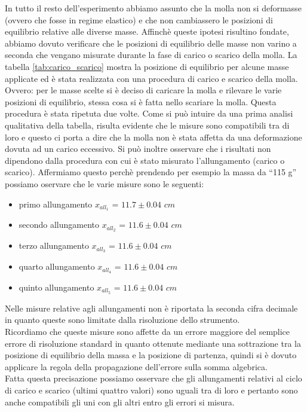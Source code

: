 In tutto il resto dell'esperimento abbiamo assunto che la molla non si deformasse (ovvero che fosse in regime elastico)
e che non cambiassero le posizioni di equilibrio relative alle diverse masse. Affinchè queste ipotesi risultino fondate,
abbiamo dovuto verificare che le posizioni di equilibrio delle masse non varino a seconda che vengano misurate durante la fase di carico o scarico della molla. La tabella \ref{tab:carico_scarico} mostra la posizione di equilibrio per alcune masse applicate ed è stata realizzata con una procedura di carico e scarico della molla. Ovvero: per le masse scelte si è deciso di caricare la molla e rilevare le varie posizioni di equilibrio, stessa cosa si è fatta nello scariare la molla. Questa procedura è stata ripetuta due volte.
Come si può intuire da una prima analisi qualitativa della tabella, risulta evidente che le misure sono compatibili tra di loro e questo ci porta a dire che la molla non è stata affetta da una deformazione dovuta ad un carico eccessivo. Si può inoltre osservare che i risultati non dipendono dalla procedura con cui è stato misurato l'allungamento (carico o scarico).
Affermiamo questo perchè prendendo per esempio la massa da ``115 g'' possiamo oservare che le varie misure sono le seguenti:
\begin{itemize}
	\item{primo allungamento $x_{all_1}$ = $11.7 \pm 0.04 \,\,cm$}
	\item{secondo allungamento $x_{all_2}$ = $11.6 \pm 0.04 \,\,cm$}
	\item{terzo allungamento $x_{all_3}$ = $11.6 \pm 0.04 \,\,cm$}
	\item{quarto allungamento $x_{all_4}$ = $11.6 \pm 0.04 \,\,cm$}
	\item{quinto allungamento $x_{all_5}$ = $11.6 \pm 0.04 \,\,cm$}
\end{itemize}
Nelle misure relative agli allungamenti non è riportata la seconda cifra decimale in quanto queste sono limitate dalla risoluzione dello strumento.\\
Ricordiamo che queste misure sono affette da un errore maggiore del semplice errore di risoluzione standard in quanto ottenute mediante una sottrazione tra la posizione di equilibrio della massa e la posizione di partenza, quindi si è dovuto applicare la regola della propagazione dell'errore sulla somma algebrica.\\
Fatta questa precisazione possiamo osservare che gli allungamenti relativi al ciclo di carico e scarico (ultimi quattro valori) sono uguali tra di loro e pertanto sono anche compatibili gli uni con gli altri entro gli errori si misura.\\
